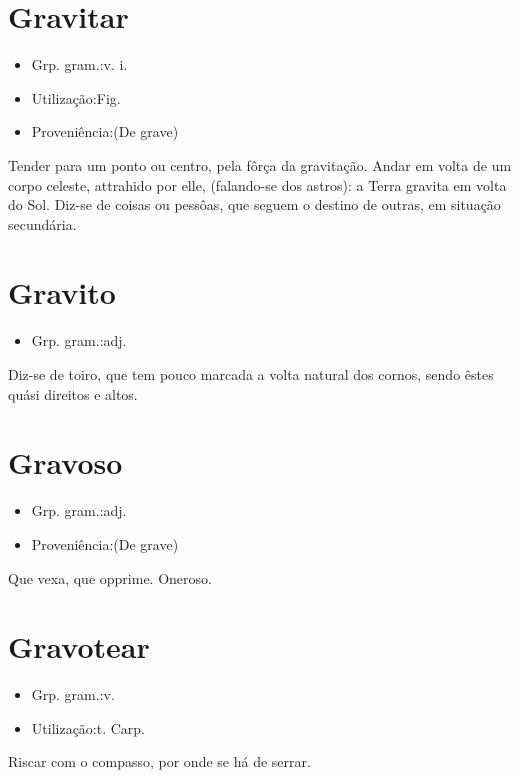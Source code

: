 \section{Gravitar}
\begin{itemize}
\item {Grp. gram.:v. i.}
\end{itemize}
\begin{itemize}
\item {Utilização:Fig.}
\end{itemize}
\begin{itemize}
\item {Proveniência:(De \textunderscore grave\textunderscore )}
\end{itemize}
Tender para um ponto ou centro, pela fôrça da gravitação.
Andar em volta de um corpo celeste, attrahido por elle, (falando-se dos astros): \textunderscore a Terra gravita em volta do Sol\textunderscore .
Diz-se de coisas ou pessôas, que seguem o destino de outras, em situação secundária.
\section{Gravito}
\begin{itemize}
\item {Grp. gram.:adj.}
\end{itemize}
Diz-se de toiro, que tem pouco marcada a volta natural dos cornos, sendo êstes quási direitos e altos.
\section{Gravoso}
\begin{itemize}
\item {Grp. gram.:adj.}
\end{itemize}
\begin{itemize}
\item {Proveniência:(De \textunderscore grave\textunderscore )}
\end{itemize}
Que vexa, que opprime.
Oneroso.
\section{Gravotear}
\begin{itemize}
\item {Grp. gram.:v.}
\end{itemize}
\begin{itemize}
\item {Utilização:t. Carp.}
\end{itemize}
Riscar com o compasso, por onde se há de serrar.
